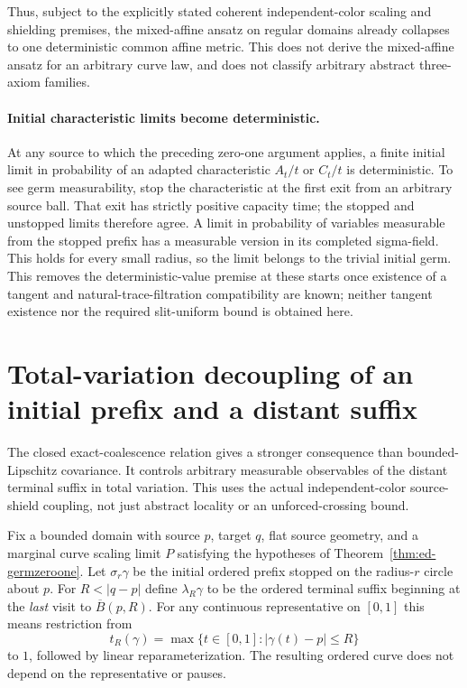 \documentclass[11pt]{article}
\theoremstyle{definition}\newtheorem{definition}[theorem]{Definition}
\theoremstyle{remark}\newtheorem{remark}[theorem]{Remark}
\begin{document}
Thus, subject to the explicitly stated coherent independent-color scaling
and shielding premises, the mixed-affine ansatz on regular domains
already collapses to one deterministic common affine metric. This does
not derive the mixed-affine ansatz for an arbitrary curve law, and does
not classify arbitrary abstract three-axiom families.

\paragraph{Initial characteristic limits become deterministic.}
At any source to which the preceding zero-one argument applies, a finite
initial limit in probability of an adapted characteristic $A_t/t$ or
$C_t/t$ is deterministic. To see germ measurability, stop the characteristic
at the first exit from an arbitrary source ball. That exit has strictly
positive capacity time; the stopped and unstopped limits therefore agree.
A limit in probability of variables measurable from the stopped prefix has
a measurable version in its completed sigma-field. This holds for every
small radius, so the limit belongs to the trivial initial germ.
This removes the deterministic-value premise at these starts once existence
of a tangent and natural-trace-filtration compatibility are known; neither
tangent existence nor the required slit-uniform bound is obtained here.


\section{Total-variation decoupling of an initial prefix and a distant suffix}
\label{sec:spatial-beta-mixing}

The closed exact-coalescence relation gives a stronger consequence than
bounded-Lipschitz covariance. It controls arbitrary measurable observables
of the distant terminal suffix in total variation. This uses the actual
independent-color source-shield coupling, not just abstract locality or
an unforced-crossing bound.

Fix a bounded domain with source $p$, target $q$, flat source geometry,
and a marginal curve scaling limit $P$ satisfying the hypotheses of
Theorem~\ref{thm:ed-germzeroone}. Let $\sigma_r\gamma$ be the initial
ordered prefix stopped on the radius-$r$ circle about $p$. For
$R<|q-p|$ define $\lambda_R\gamma$ to be the ordered terminal suffix
beginning at the \emph{last} visit to $\overline B(p,R)$. For any
continuous representative on $[0,1]$ this means restriction from
\[
 t_R(\gamma)=\max\{t\in[0,1]:|\gamma(t)-p|\leq R\}
\]
to $1$, followed by linear reparameterization. The resulting ordered
curve does not depend on the representative or pauses.
\end{document}
